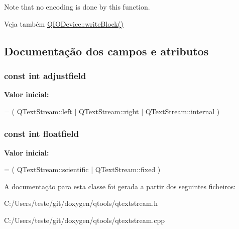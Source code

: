 Note that no encoding is done by this function.

\begin{DoxySeeAlso}{Veja também}
\hyperlink{class_q_i_o_device_a90a5a6111eca9a444970cf49aea9f9a8}{Q\-I\-O\-Device\-::write\-Block()} 
\end{DoxySeeAlso}


\subsection{Documentação dos campos e atributos}
\hypertarget{class_q_text_stream_a16ceafaa892cb03138908bff6e422a20}{
\subsubsection[{adjustfield}]{\setlength{\rightskip}{0pt plus 5cm}const int adjustfield\hspace{0.3cm}{\ttfamily [static]}}}\label{class_q_text_stream_a16ceafaa892cb03138908bff6e422a20}
{\bfseries Valor inicial\-:}
\begin{DoxyCode}
= ( QTextStream::left |
                       QTextStream::right |
                       QTextStream::internal )
\end{DoxyCode}
\hypertarget{class_q_text_stream_a162902bfb257580a2679ab313cafde5e}{
\subsubsection[{floatfield}]{\setlength{\rightskip}{0pt plus 5cm}const int floatfield\hspace{0.3cm}{\ttfamily [static]}}}\label{class_q_text_stream_a162902bfb257580a2679ab313cafde5e}
{\bfseries Valor inicial\-:}
\begin{DoxyCode}
= ( QTextStream::scientific |
                       QTextStream::fixed )
\end{DoxyCode}


A documentação para esta classe foi gerada a partir dos seguintes ficheiros\-:\begin{DoxyCompactItemize}
\item 
C\-:/\-Users/teste/git/doxygen/qtools/qtextstream.\-h\item 
C\-:/\-Users/teste/git/doxygen/qtools/qtextstream.\-cpp\end{DoxyCompactItemize}
